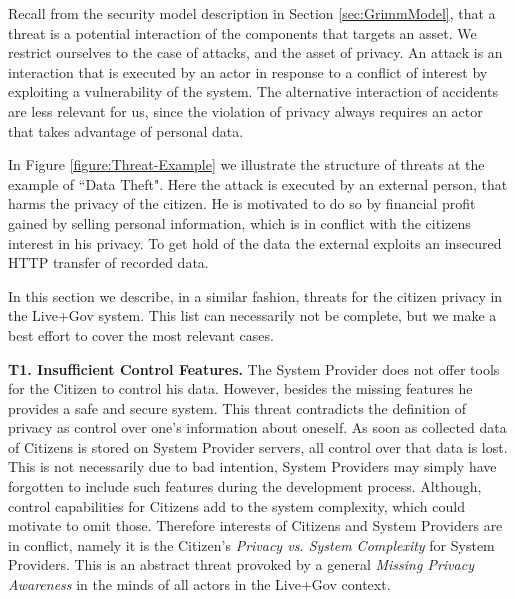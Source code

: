 

Recall from the security model description in Section \ref{sec:GrimmModel}, that a threat is a potential interaction of the components that targets an asset.
We restrict ourselves to the case of attacks, and the asset of privacy.
An attack is an interaction that is executed by an actor in response to a conflict of interest by exploiting a vulnerability of the system.
The alternative interaction of accidents are less relevant for us, since the violation of privacy always requires an actor that takes advantage of personal data.

In Figure \ref{figure:Threat-Example} we illustrate the structure of threats at the example of ``Data Theft".
Here the attack is executed by an external person, that harms the privacy of the citizen.
He is motivated to do so by financial profit gained by selling personal information, which is in conflict with the citizens interest in his privacy.
To get hold of the data the external exploits an insecured HTTP transfer of recorded data.

In this section we describe, in a similar fashion, threats for the citizen privacy in the Live+Gov system.
This list can necessarily not be complete, but we make a best effort to cover the most relevant cases.



\textbf{T1. Insufficient Control Features.}
The System Provider does not offer tools for the Citizen to control his data.
However, besides the missing features he provides a safe and secure system.
This threat contradicts the definition of privacy as control over one's information about oneself.
As soon as collected data of Citizens is stored on System Provider servers, all control over that data is lost.
This is not necessarily due to bad intention, System Providers may simply have forgotten to include such features during the development process.
Although, control capabilities for Citizens add to the system complexity, which could motivate to omit those. 
Therefore interests of Citizens and System Providers are in conflict, namely it is the Citizen's \textit{Privacy vs. System Complexity} for System Providers.
This is an abstract threat provoked by a general \textit{Missing Privacy Awareness} in the minds of all actors in the Live+Gov context.

